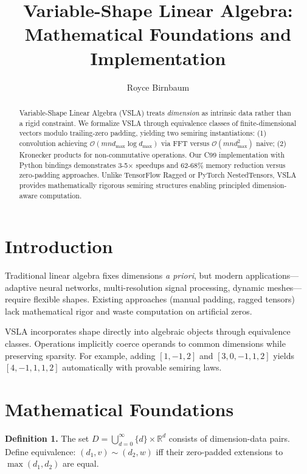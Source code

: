 \documentclass[sigconf]{acmart}
\title{Variable-Shape Linear Algebra: Mathematical Foundations and Implementation}
\author{Royce Birnbaum}
\affiliation{%
  \institution{Independent Researcher}
  \city{Mesa}
  \state{Arizona}
  \country{United States}
}
\begin{document}
\begin{abstract}
Variable-Shape Linear Algebra (VSLA) treats \emph{dimension} as intrinsic data rather than a rigid constraint. We formalize VSLA through equivalence classes of finite-dimensional vectors modulo trailing-zero padding, yielding two semiring instantiations: (1) convolution achieving $\mathcal{O}(mn d_{\max} \log d_{\max})$ via FFT versus $\mathcal{O}(mn d_{\max}^2)$ naive; (2) Kronecker products for non-commutative operations. Our C99 implementation with Python bindings demonstrates 3-5× speedups and 62-68\% memory reduction versus zero-padding approaches. Unlike TensorFlow Ragged or PyTorch NestedTensors, VSLA provides mathematically rigorous semiring structures enabling principled dimension-aware computation.
\end{abstract}

\maketitle

\section{Introduction}

Traditional linear algebra fixes dimensions \emph{a priori}, but modern applications—adaptive neural networks, multi-resolution signal processing, dynamic meshes—require flexible shapes. Existing approaches (manual padding, ragged tensors) lack mathematical rigor and waste computation on artificial zeros.

VSLA incorporates shape directly into algebraic objects through equivalence classes. Operations implicitly coerce operands to common dimensions while preserving sparsity. For example, adding $[1, -1, 2]$ and $[3, 0, -1, 1, 2]$ yields $[4, -1, 1, 1, 2]$ automatically with provable semiring laws.

\section{Mathematical Foundations}

\textbf{Definition 1.} The set $D = \bigcup_{d=0}^{\infty} \{d\} \times \mathbb{R}^d$ consists of dimension-data pairs. Define equivalence: $(d_1,v) \sim (d_2,w)$ iff their zero-padded extensions to $\max(d_1,d_2)$ are equal.
\end{document}
